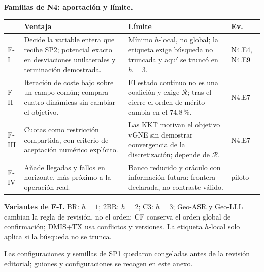 {\scriptsize
\textbf{Familias de N4: aportación y límite.}\par
\renewcommand{\arraystretch}{1.0}
\begin{tabularx}{\linewidth}{@{}l>{\raggedright\arraybackslash}X>{\raggedright\arraybackslash}Xl@{}}
\toprule
&\textbf{Ventaja}&\textbf{Límite}&\textbf{Ev.}\\
\midrule
F-I&Decide la variable entera que recibe SP2; potencial exacto en desviaciones
unilaterales y terminación demostrada.&Mínimo $h$-local, no global; la etiqueta exige
búsqueda no truncada y aquí se truncó en $h=3$.&N4.E4, N4.E9\\
F-II&Iteración de coste bajo sobre un campo común; compara cuatro dinámicas sin
cambiar el objetivo.&El estado continuo no es una coalición y exige $\mathcal R$;
tras el cierre el orden de mérito cambia en el 74,8\,\%.&N4.E7\\
F-III&Cuotas como restricción compartida, con criterio de aceptación numérico
explícito.&Las KKT motivan el objetivo vGNE sin demostrar convergencia de la
discretización; depende de $\mathcal R$.&N4.E7\\
F-IV&Añade llegadas y fallos en horizonte, más próximo a la operación real.&Banco
reducido y oráculo con información futura: frontera declarada, no contraste
válido.&piloto\\
\bottomrule
\end{tabularx}%
}%

{\scriptsize
\textbf{Variantes de F-I.} BR: $h=1$; 2BR: $h=2$; C3: $h=3$; Geo-ASR y Geo-LLL
cambian la regla de revisión, no el orden; CF conserva el orden global de
confirmación; DMIS+TX usa conflictos y versiones. La etiqueta $h$-local solo aplica
si la búsqueda no se trunca.
}

{\footnotesize Las configuraciones y semillas de SP1 quedaron congeladas antes de la
revisión editorial; guiones y configuraciones se recogen en este anexo.}


